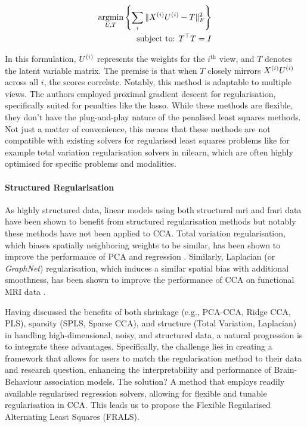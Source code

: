 \begin{align}
    \label{eq:fu}
    \underset{U, T}{\mathrm{argmin}}\left\{\sum_i \|X^{(i)} U^{(i)} - T\|_F^2\right\}\\
    \text{subject to: }T^\top T = I\\
\end{align}

In this formulation, \(U^{(i)}\) represents the \gls{weights} for the $i^{\text{th}}$ view, and \(T\) denotes the latent variable matrix.
The premise is that when \(T\) closely mirrors \(X^{(i)} U^{(i)}\) across all \(i\), the scores correlate.
Notably, this method is adaptable to multiple views.
The authors employed proximal gradient descent for regularisation, specifically suited for penalties like the lasso.
While these methods are flexible, they don't have the plug-and-play nature of the penalised least squares methods.
Not just a matter of convenience, this means that these methods are not compatible with existing solvers for regularised least squares problems like for example total variation regularisation solvers in nilearn, which are often highly optimised for specific problems and modalities.

\paragraph{Structured Regularisation}

As highly structured data, linear models using both structural \acrshort{mri} and f\acrshort{mri} data have been shown to benefit from structured regularisation methods but notably these methods have not been applied to CCA.
Total variation regularisation, which biases spatially neighboring weights to be similar, has been shown to improve the performance of PCA \citep{de2017structured} and regression \citep{michel2011total,dohmatob2014benchmarking, baldassarre2012structured}.
Similarly, Laplacian (or \textit{GraphNet}) regularisation, which induces a similar spatial bias with additional smoothness, has been shown to improve the performance of CCA on functional MRI data \citep{grosenick2013interpretable}.

Having discussed the benefits of both shrinkage (e.g., PCA-CCA, Ridge CCA, PLS), sparsity (SPLS, Sparse CCA), and structure (Total Variation, Laplacian) in handling high-dimensional, noisy, and structured data, a natural progression is to integrate these advantages.
Specifically, the challenge lies in creating a framework that allows for users to match the regularisation method to their data and research question, enhancing the interpretability and performance of Brain-Behaviour association models.
The solution?
A method that employs readily available regularised regression solvers, allowing for flexible and tunable regularisation in CCA.
This leads us to propose the Flexible Regularised Alternating Least Squares (FRALS).

